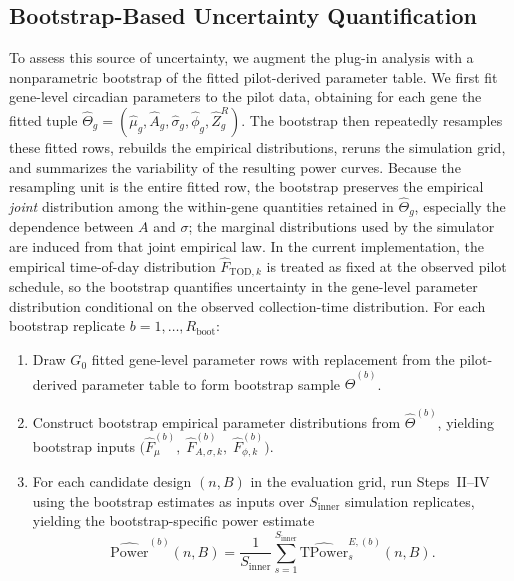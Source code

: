 \documentclass{article}
\begin{document}
\subsection{Bootstrap-Based Uncertainty Quantification}
\label{sec:bootstrap}

To assess this source of uncertainty, we augment the plug-in analysis with a
nonparametric bootstrap of the fitted pilot-derived parameter table. We first
fit gene-level circadian parameters to the pilot data, obtaining for each gene
the fitted tuple
$\hat{\Theta}_g=(\hat{\mu}_g,\hat{A}_g,\hat{\sigma}_g,\hat{\phi}_g,\hat{Z}_g^R)$.
The bootstrap then repeatedly resamples these fitted rows, rebuilds the
empirical distributions, reruns the simulation grid, and summarizes the
variability of the resulting power curves. Because the resampling unit is the
entire fitted row, the bootstrap preserves the empirical \emph{joint}
distribution among the within-gene quantities retained in $\hat{\Theta}_g$,
especially the dependence between $A$ and $\sigma$; the marginal distributions
used by the simulator are induced from that joint empirical law. In the current
implementation, the empirical time-of-day distribution
$\hat{F}_{\mathrm{TOD},k}$ is treated as fixed at the observed pilot schedule,
so the bootstrap quantifies uncertainty in the gene-level parameter
distribution conditional on the observed collection-time distribution.
For each bootstrap replicate
$b=1,\ldots,R_{\mathrm{boot}}$:

\begin{enumerate}
\item Draw $G_0$ fitted gene-level parameter rows with replacement from the
pilot-derived parameter table to form bootstrap sample
$\widehat{\Theta}^{(b)}$.

\item Construct bootstrap empirical parameter distributions from
$\widehat{\Theta}^{(b)}$, yielding bootstrap inputs
\(\bigl(\hat{F}_{\mu}^{(b)},\;\hat{F}_{A,\sigma,k}^{(b)},\;\hat{F}_{\phi,k}^{(b)}\bigr)\).

\item For each candidate design $(n,B)$ in the evaluation grid, run Steps~II--IV
using the bootstrap estimates as inputs over $S_{\mathrm{inner}}$ simulation
replicates, yielding the bootstrap-specific power estimate
\begin{equation}
\widehat{\mathrm{Power}}^{(b)}(n,B)
=
\frac{1}{S_{\mathrm{inner}}}
\sum_{s=1}^{S_{\mathrm{inner}}}
\widehat{\mathrm{TPower}}_s^{E,(b)}(n,B).
\label{eq:boot_power_rep}
\end{equation}
\end{enumerate}
\end{document}
